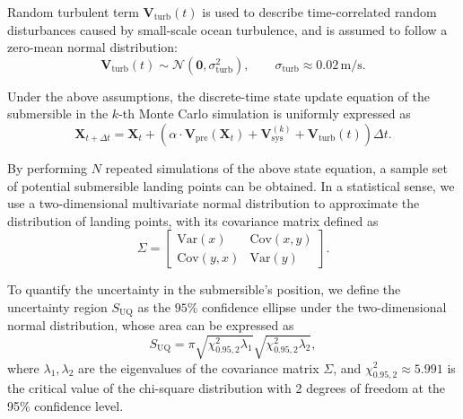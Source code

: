 \documentclass{mcmthesis}
\begin{document}
Random turbulent term $\mathbf{V}_{\mathrm{turb}}(t)$
is used to describe time-correlated random disturbances caused by small-scale ocean turbulence,
and is assumed to follow a zero-mean normal distribution:
\begin{equation}
\mathbf{V}_{\mathrm{turb}}(t)
\sim
\mathcal{N}\!\left( \mathbf{0}, \sigma_{\mathrm{turb}}^{2} \right),
\qquad
\sigma_{\mathrm{turb}} \approx 0.02\,\mathrm{m/s}.
\end{equation}

Under the above assumptions,
the discrete-time state update equation of the submersible in the $k$-th Monte Carlo simulation is uniformly expressed as
\begin{equation}
\mathbf{X}_{t+\Delta t}
=
\mathbf{X}_t
+
\left(
\alpha \cdot \mathbf{V}_{\mathrm{pre}}(\mathbf{X}_t)
+
\mathbf{V}_{\mathrm{sys}}^{(k)}
+
\mathbf{V}_{\mathrm{turb}}(t)
\right)\Delta t.
\end{equation}

By performing $N$ repeated simulations of the above state equation,
a sample set of potential submersible landing points can be obtained.
In a statistical sense,
we use a two-dimensional multivariate normal distribution to approximate the distribution of landing points,
with its covariance matrix defined as
\begin{equation}
\Sigma
=
\begin{bmatrix}
\mathrm{Var}(x) & \mathrm{Cov}(x,y) \\
\mathrm{Cov}(y,x) & \mathrm{Var}(y)
\end{bmatrix}.
\end{equation}

To quantify the uncertainty in the submersible's position,
we define the uncertainty region $S_{\mathrm{UQ}}$
as the $95\%$ confidence ellipse under the two-dimensional normal distribution,
whose area can be expressed as
\begin{equation}
S_{\mathrm{UQ}}
=
\pi
\sqrt{ \chi_{0.95,2}^{2} \lambda_1 }
\sqrt{ \chi_{0.95,2}^{2} \lambda_2 },
\end{equation}
where
$\lambda_1,\lambda_2$ are the eigenvalues of the covariance matrix ${\Sigma}$,
and
$\chi_{0.95,2}^{2} \approx 5.991$
is the critical value of the chi-square distribution with 2 degrees of freedom at the 95\% confidence level.
\end{document}
